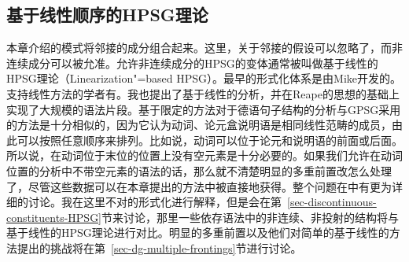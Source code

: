 \subsection{基于线性顺序的HPSG理论}
\label{sec-linearization-HPSG}

本章介绍的模式将邻接的成分组合起来。这里，关于邻接的假设可以忽略了，而非连续成分可以被允准。允许非连续成分的HPSG的变体通常被叫做基于线性的HPSG理论（Linearization"=based HPSG）。最早的形式化体系是由Mike\citet{Reape91,Reape92a,Reape94a}开发的。支持线性方法的学者有\citet{Kathol95a,Kathol2000a,DS99a,RS99a,Crysmann2003c,BS2004a,Sato:06cluk,Wetta2011a}。我也提出了基于线性的分析\citep{Mueller99a,Mueller2002b}，并在Reape的思想的基础上实现了大规模的语法片段\citep{Babel}。基于限定的方法对于德语句子结构的分析与GPSG采用的方法是十分相似的，因为它认为动词、论元盒说明语是相同线性范畴的成员，由此可以按照任意顺序来排列。比如说，动词可以位于论元和说明语的前面或后面。所以说，在动词位于末位的位置上没有空元素是十分必要的。如果我们允许在动词位置的分析中不带空元素的语法的话，那么就不清楚明显的多重前置改怎么处理了，尽管这些数据可以在本章提出的方法中被直接地获得。整个问题在中有更为详细的讨论。我在这里不对的形式化进行解释，但是会在第~\ref{sec-discontinuous-constituents-HPSG}节来讨论，那里一些依存语法中的非连续、非投射的结构将与基于线性的HPSG理论进行对比。明显的多重前置以及他们对简单的基于线性的方法提出的挑战将在第~\ref{sec-dg-multiple-frontings}节进行讨论。
